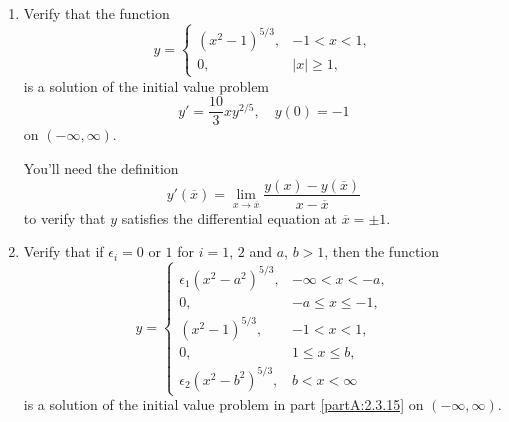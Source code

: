 \documentclass{ximera}
\begin{document}
\begin{problem}\label{exer:2.3.15}
\begin{enumerate}
\item\label{partA:2.3.15} %
Verify that the function
$$
y = \left\{ \begin{array}{cl}
(x^2-1)^{5/3}, & -1 < x < 1, \\
0, & |x| \geq 1, \end{array} \right.
$$
is a solution of the initial value problem
$$
y'=\frac{10}{3}xy^{2/5}, \quad y(0)=-1
$$
on $(-\infty,\infty)$. 
\begin{hint}
You'll need the definition $$
y'(\overline{x}) = \lim_{x \to \overline{x}} \frac{y(x)-y(\overline{x})}{x-\overline{x}} $$ to verify that $y$ satisfies the differential
equation at $\overline{x} = \pm 1$.
\end{hint}

\item %
Verify that if $\epsilon_i=0$ or $1$ for $i=1$, $2$ and $a$, $b>1$, then
the function
$$
y = \left\{ \begin{array}{cl}
\epsilon_1(x^2-a^2)^{5/3}, & - \infty < x < -a, \\
0, & -a \leq x \leq -1, \\
(x^2-1)^{5/3}, &  -1 < x < 1, \\
0, & 1 \leq x \leq b, \\
\epsilon_2(x^2-b^2)^{5/3}, & b < x < \infty 
\end{array} \right.
$$
is a solution of the initial value problem in part \ref{partA:2.3.15} on
$(-\infty,\infty)$.
\end{enumerate}
\end{problem}
\end{document}
